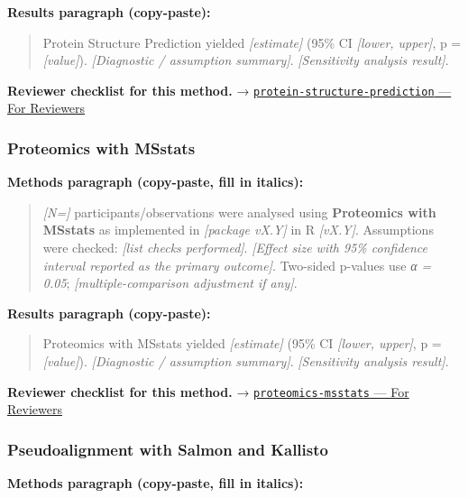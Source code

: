 \documentclass[
]{article}
\begin{document}
\textbf{Results paragraph (copy-paste):}

\begin{quote}
Protein Structure Prediction yielded \emph{{[}estimate{]}} (95\% CI
\emph{{[}lower, upper{]}}, p = \emph{{[}value{]}}). \emph{{[}Diagnostic
/ assumption summary{]}}. \emph{{[}Sensitivity analysis result{]}}.
\end{quote}

\textbf{Reviewer checklist for this method.} →
\href{../chapters/12-bioinformatics/protein-structure-prediction.Rmd\#for-reviewers}{\texttt{protein-structure-prediction}
--- For Reviewers}

\subsubsection{Proteomics with MSstats}\label{proteomics-with-msstats}

\textbf{Methods paragraph (copy-paste, fill in italics):}

\begin{quote}
\emph{{[}N={]}} participants/observations were analysed using
\textbf{Proteomics with MSstats} as implemented in \emph{{[}package
vX.Y{]}} in R \emph{{[}vX.Y{]}}. Assumptions were checked: \emph{{[}list
checks performed{]}}. \emph{{[}Effect size with 95\% confidence interval
reported as the primary outcome{]}}. Two-sided p-values use \emph{α =
0.05}; \emph{{[}multiple-comparison adjustment if any{]}}.
\end{quote}

\textbf{Results paragraph (copy-paste):}

\begin{quote}
Proteomics with MSstats yielded \emph{{[}estimate{]}} (95\% CI
\emph{{[}lower, upper{]}}, p = \emph{{[}value{]}}). \emph{{[}Diagnostic
/ assumption summary{]}}. \emph{{[}Sensitivity analysis result{]}}.
\end{quote}

\textbf{Reviewer checklist for this method.} →
\href{../chapters/12-bioinformatics/proteomics-msstats.Rmd\#for-reviewers}{\texttt{proteomics-msstats}
--- For Reviewers}

\subsubsection{Pseudoalignment with Salmon and
Kallisto}\label{pseudoalignment-with-salmon-and-kallisto}

\textbf{Methods paragraph (copy-paste, fill in italics):}
\end{document}
